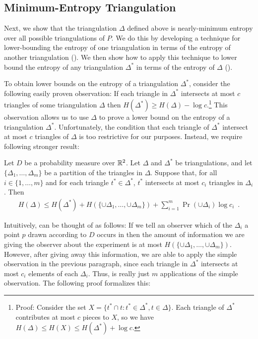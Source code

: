 \documentclass[lotsofwhite]{patmorin}
\begin{document}
\subsection{Minimum-Entropy Triangulation}

Next, we show that the triangulation $\Delta$ defined above is
nearly-minimum entropy over all possible triangulations of $P$.  We do
this by developing a technique for lower-bounding the entropy of one
triangulation in terms of the entropy of another triangulation
().  We then show how to apply this technique to lower
bound the entropy of any triangulation $\Delta^*$ in terms of the
entropy of $\Delta$ ().
  
To obtain lower bounds on the entropy of a triangulation $\Delta^*$,
consider the following easily proven observation: If each triangle in
$\Delta^*$ intersects at most $c$ triangles of some triangulation
$\Delta$ then $H(\Delta^*) \ge H(\Delta) - \log c$.\footnote{Proof:
Consider the set $X=\{ t^*\cap t : t^*\in\Delta^*, t\in \Delta\}$.
Each triangle of $\Delta^*$ contributes at most $c$ pieces to $X$, so
we have $H(\Delta) \le H(X) \le H(\Delta^*) + \log c$.}  This
observation allows us to use $\Delta$ to prove a lower bound on the
entropy of a triangulation $\Delta^*$.  Unfortunately, the condition
that each triangle of $\Delta^*$ intersect at most $c$ triangles of
$\Delta$ is too restrictive for our purposes.  Instead, we require
following stronger result:

\begin{lem}
Let $D$ be a probability measure over $\mathbb{R}^2$.  Let $\Delta$ and
$\Delta^*$ be triangulations, and let $\{\Delta_1,\ldots,\Delta_m\}$
be a partition of the triangles in $\Delta$.  Suppose that, for all
$i\in\{1,\ldots,m\}$ and for each triangle $t^*\in\Delta^*$, $t^*$
intersects at most $c_i$ triangles in $\Delta_i$.  Then
\begin{eqnarray*}
   H(\Delta) \le 
	 H(\Delta^*) + H(\{\cup\Delta_1,\ldots,\cup\Delta_m\}) + 
	\sum_{i=1}^m \Pr(\cup\Delta_i)\log c_i
 \enspace . 
\end{eqnarray*}
\end{lem}

Intuitively,  can be thought of as follows:  If we tell
an observer which of the $\Delta_i$ a point $p$ drawn according to $D$
occurs in then the amount of information we are giving the observer
about the experiment is at most
$H(\{\cup\Delta_1,\ldots,\cup\Delta_m\})$.  However, after giving away
this information, we are able to apply the simple observation in the
previous paragraph, since each triangle in $\Delta^*$ intersects at
most $c_i$ elements of each $\Delta_i$.  Thus,  is really
just $m$ applications of the simple observation.  The following proof
formalizes this:
\end{document}
